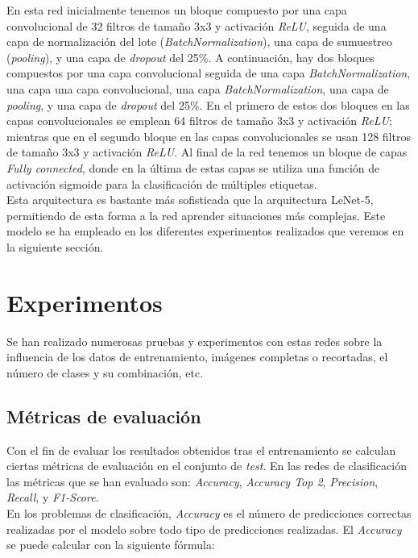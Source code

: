 En esta red inicialmente tenemos un bloque compuesto por una capa convolucional de 32 filtros de tamaño 3x3 y activación \textit{ReLU}, seguida de una capa de normalización del lote (\textit{BatchNormalization}), una capa de sumuestreo (\textit{pooling}), y una capa de \textit{dropout} del 25\%. A continuación, hay dos bloques compuestos por una capa convolucional seguida de una capa \textit{BatchNormalization}, una capa una capa convolucional, una capa \textit{BatchNormalization}, una capa de \textit{pooling}, y una capa de \textit{dropout} del 25\%. En el primero de estos dos bloques en las capas convolucionales se emplean 64 filtros de tamaño 3x3 y activación \textit{ReLU}; mientras que en el segundo bloque en las capas convolucionales se usan 128 filtros de tamaño 3x3 y activación \textit{ReLU}. Al final de la red tenemos un bloque de capas \textit{Fully connected}, donde en la última de estas capas se utiliza una función de activación sigmoide para la clasificación de múltiples etiquetas.\\


Esta arquitectura es bastante más sofisticada que la arquitectura LeNet-5, permitiendo de esta forma a la red aprender situaciones más complejas. Este modelo se ha empleado en los diferentes experimentos realizados que veremos en la siguiente sección.


\section{Experimentos}
Se han realizado numerosas pruebas y experimentos con estas redes sobre la influencia de los datos
de entrenamiento, imágenes completas o recortadas, el número de clases y su combinación, etc.\\


\subsection{Métricas de evaluación}\label{metrica_clasificacion}

Con el fin de evaluar los resultados obtenidos tras el entrenamiento se calculan ciertas métricas de evaluación en el conjunto de \textit{test}. En las redes de clasificación las métricas que se han evaluado son: \textit{Accuracy}, \textit{Accuracy Top 2}, \textit{Precision}, \textit{Recall}, y \textit{F1-Score}.\\

En los problemas de clasificación, \textit{Accuracy} es el número de predicciones correctas realizadas por el modelo sobre todo tipo de predicciones realizadas. El \textit{Accuracy} se puede calcular con la siguiente fórmula:

